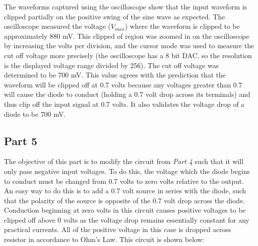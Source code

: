 \documentclass[12pt]{article}
\begin{document}
%
The waveforms captured using the oscilloscope show that the input waveform is clipped partially on the positive swing of the sine wave as expected. The oscilloscope measured the voltage ($V_{max}$) where the waveform is clipped to be approximately 880 mV. This clipped of region was zoomed in on the oscilloscope by increasing the volts per division, and the cursor mode was used to measure the cut off voltage more precisely (the oscilloscope has a 8 bit DAC, so the resolution is the displayed voltage range divided by 256). The cut off voltage was determined to be 700 mV. This value agrees with the prediction that the waveform will be clipped off at 0.7 volts because any voltages greater than 0.7 will cause the diode to conduct (holding a 0.7 volt drop across its terminals) and thus clip off the input signal at 0.7 volts. It also validates the voltage drop of a diode to be 700 mV.\par

\pagebreak

\subsection*{Part 5}
The objective of this part is to modify the circuit from \textit{Part 4} such that it will only pass negative input voltages. To do this, the voltage which the diode begins to conduct must be changed from 0.7 volts to zero volts relative to the output. An easy way to do this is to add a 0.7 volt source in series with the diode, such that the polarity of the source is opposite of the 0.7 volt drop across the diode. Conduction beginning at zero volts in this circuit causes positive voltages to be clipped off above 0 volts as the voltage drop remains essentially constant for any practical currents. All of the positive voltage in this case is dropped across resistor in accordance to Ohm's Law. This circuit is shown below:\par
\end{document}
